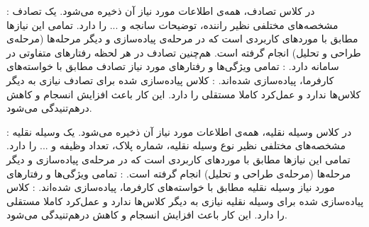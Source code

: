 		  : در کلاس تصادف، همه‌ی اطلاعات مورد نیاز آن ذخیره می‌شود. یک تصادف مشخصه‌های مختلفی نظیر راننده، توضیحات سانجه و ... را دارد. تمامی این نیازها مطابق با موردهای کاربردی است که در  مرحله‌ی پیاده‌سازی و دیگر مرحله‌ها (مرحله‌ی طراحی و تحلیل) انجام گرفته است. هم‌چنین تصادف در هر لحظه رفتارهای متفاوتی در سامانه دارد. 
		 : تمامی ویژگی‌ها و رفتارهای مورد نیاز تصادف مطابق با خواسته‌های کارفرما، پیاده‌سازی شده‌اند.
		 : کلاس‌ پیاده‌سازی شده برای تصادف نیازی به دیگر کلاس‌ها ندارد و عمل‌کرد کاملا مستقلی را دارد. این کار باعث افزایش انسجام و کاهش درهم‌تنیدگی می‌شود.
	\newpage
	 
	
		  : در کلاس وسیله نقلیه، همه‌ی اطلاعات مورد نیاز آن ذخیره می‌شود. یک وسیله نقلیه مشخصه‌های مختلفی نظیر نوع وسیله نقلیه،  شماره پلاک، تعداد وظیفه و ... را دارد. تمامی این نیازها مطابق با موردهای کاربردی است که در  مرحله‌ی پیاده‌سازی و دیگر مرحله‌ها (مرحله‌ی طراحی و تحلیل) انجام گرفته است.
		 : تمامی ویژگی‌ها و رفتارهای مورد نیاز وسیله نقلیه مطابق با خواسته‌های کارفرما، پیاده‌سازی شده‌اند.
		 : کلاس‌ پیاده‌سازی شده برای وسیله نقلیه نیازی به دیگر کلاس‌ها ندارد و عمل‌کرد کاملا مستقلی را دارد. این کار باعث افزایش انسجام و کاهش درهم‌تنیدگی می‌شود.

